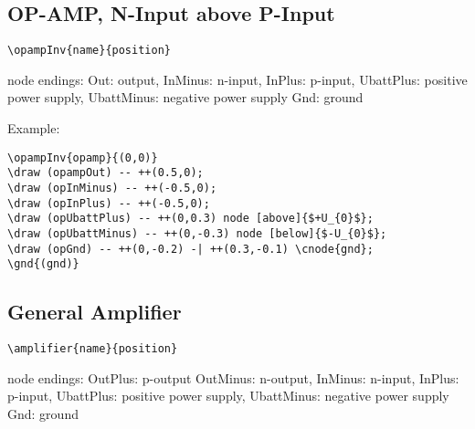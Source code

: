 \documentclass[parskip=full]{scrartcl}
\begin{document}
\subsection{OP-AMP, N-Input above P-Input}

\begin{verbatim}
\opampInv{name}{position}
\end{verbatim}
node endings: Out: output, InMinus: n-input, InPlus: p-input,
              UbattPlus: positive power supply,
              UbattMinus: negative power supply
              Gnd: ground

Example:\\
\begin{minipage}{0.8\textwidth}
\begin{verbatim}
\opampInv{opamp}{(0,0)}
\draw (opampOut) -- ++(0.5,0);
\draw (opInMinus) -- ++(-0.5,0);
\draw (opInPlus) -- ++(-0.5,0);
\draw (opUbattPlus) -- ++(0,0.3) node [above]{$+U_{0}$};
\draw (opUbattMinus) -- ++(0,-0.3) node [below]{$-U_{0}$};
\draw (opGnd) -- ++(0,-0.2) -| ++(0.3,-0.1) \cnode{gnd};
\gnd{(gnd)}
\end{verbatim}
\end{minipage}
\begin{minipage}{0.19\textwidth}
\end{minipage}

\subsection{General Amplifier}

\begin{verbatim}
\amplifier{name}{position}
\end{verbatim}
node endings: OutPlus: p-output OutMinus: n-output,
              InMinus: n-input, InPlus: p-input,
              UbattPlus: positive power supply,
              UbattMinus: negative power supply
              Gnd: ground
\end{document}
